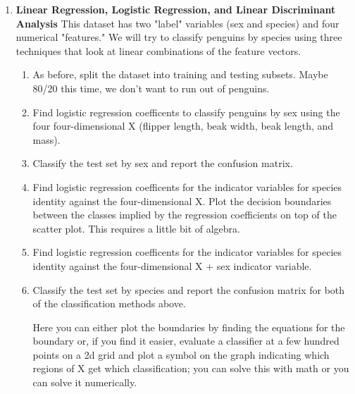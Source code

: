 \documentclass[12pt]{book}
\theoremstyle{definition}
\begin{document}
\begin{enumerate}
\item\label{penguin}
\textbf{Linear Regression, Logistic Regression, and Linear Discriminant Analysis }
This dataset has two "label" variables (sex and species) and four numerical "features."   We will try to classify penguins by species using three techniques that look at linear combinations of the feature vectors.
\begin{enumerate}[label=(\alph*)]
\item 
As before, split the dataset into training and testing subsets.  Maybe 80/20 this time, we don't want to run out of penguins.

\item
Find logistic regression coefficents to classify penguins by sex using the four four-dimensional X (flipper length, beak width, beak length, and mass). 

\item
Classify the test set by sex and report the confusion matrix.

\item
Find logistic regression coefficents for the indicator variables for species identity against the four-dimensional X.  
Plot the decision boundaries between the classes implied by the regression coefficients on top of the scatter plot.  This requires a little bit of algebra.

\item
Find logistic regression coefficents for the indicator variables for species identity against the four-dimensional X + sex indicator variable. 

\item
Classify the test set by species and report the confusion matrix for both of the classification methods above.

Here you can either plot the boundaries by finding the equations for the boundary or, if you find it easier, evaluate a classifier at a few hundred points on a 2d grid and plot a symbol on the graph indicating which regions of X get which classification; you can solve this with math or you can solve it numerically.  
\end{enumerate}





\end{enumerate}
\end{document}
